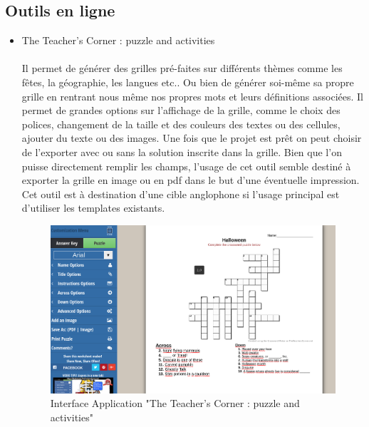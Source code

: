 \documentclass [ 11 pt ] {article}
\begin{document}
    \subsection{Outils en ligne}
    \begin{itemize}
        
        \item The Teacher’s Corner : puzzle and activities \cite{Cpm} \\
        \\ Il permet de générer des grilles pré-faites sur différents thèmes comme les fêtes, la géographie, les langues etc.. Ou bien de générer soi-même sa propre grille en rentrant nous même nos propres mots et leurs définitions associées. Il permet de grandes options sur l’affichage de la grille, comme le choix des polices, changement de la taille et des couleurs des textes ou des cellules, ajouter du texte ou des images. Une fois que le projet est prêt on peut choisir de l’exporter avec ou sans la solution inscrite dans la grille. Bien que l’on puisse directement remplir les champs, l’usage de cet outil semble destiné à exporter la grille en image ou en pdf dans le but d’une éventuelle impression. Cet outil est à destination d’une cible anglophone si l’usage principal est d’utiliser les templates existants.
        
        \begin{center}
            \begin{figure}[H]
                \begin{center}
                    \includegraphics[scale=0.25]{theteachercorner.png}
                    \caption{Interface Application "The Teacher’s Corner : puzzle and activities" }
                    \label{Pres}
                \end{center}
            \end{figure}
        \end{center}
        

\end{itemize}
\end{document}

